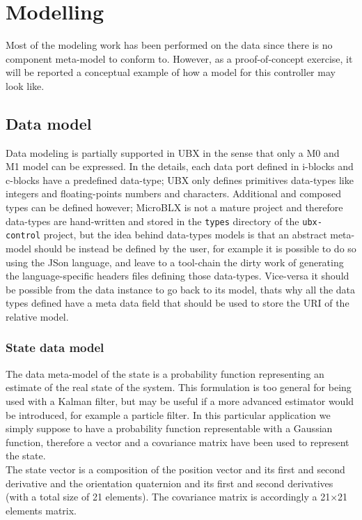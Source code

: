 \chapter{Modelling} \label{ch:model} 
Most of the modeling work has been performed on the data since there is no component meta-model to conform to. However, as a proof-of-concept exercise, it will be reported a conceptual example of how a model for this controller may look like.

\section{Data model}
Data modeling is partially supported in UBX in the sense that only a M0 and M1 model can be expressed. In the details, each data port defined in i-blocks and c-blocks have a predefined data-type; UBX only defines primitives data-types like integers and floating-points numbers and characters. Additional and composed types can be defined however; MicroBLX is not a mature project and therefore data-types are hand-written and stored in the \texttt{types} directory of the \texttt{ubx-control} project, but the idea behind data-types models is that an abstract meta-model should be instead be defined by the user, for example it is possible to do so using the JSon language, and leave to a tool-chain the dirty work of generating the language-specific headers files defining those data-types. Vice-versa it should be possible from the data instance to go back to its model, thats why all the data types defined have a meta data field that should be used to store the URI of the relative model.

\subsection{State data model}
The data meta-model of the state is a probability function representing an estimate of the real state of the system. This formulation is too general for being used with a Kalman filter, but may be useful if a more advanced estimator would be introduced, for example a particle filter. In this particular application we simply suppose to have a probability function representable with a Gaussian function, therefore a vector and a covariance matrix have been used to represent the state.\\
The state vector is a composition of the position vector and its first and second derivative and the orientation quaternion and its first and second derivatives (with a total size of 21 elements). The covariance matrix is accordingly a 21$\times$21 elements matrix.

